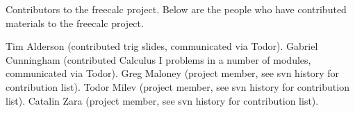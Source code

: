 Contributors to the freecalc project. Below are the people who have contributed materials to the freecalc project. 

Tim Alderson (contributed trig slides, communicated via Todor).
Gabriel Cunningham (contributed Calculus I problems in a number of modules, communicated via Todor).
Greg Maloney (project member, see svn history for contribution list).
Todor Milev (project member, see svn history for contribution list).
Catalin Zara (project member, see svn history for contribution list).
